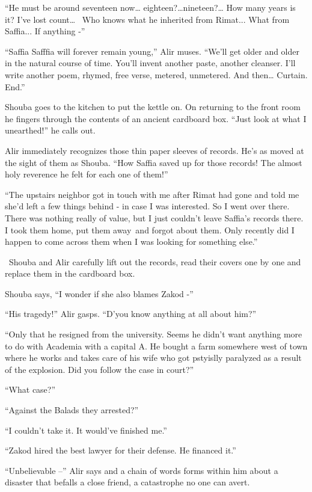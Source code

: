 \documentclass[twoside,11pt]{book}
\begin{document}
``He must be around seventeen now{\dots} eighteen?{\dots}nineteen?{\dots} How many years is it? I've lost
count{\dots} ~Who knows what he inherited from Rimat... What from Saffia... If anything -''

``Saffia Safffia will forever remain young,'' Alir muses. ``We'll get older and
older in the natural course of time. You'll invent another paste, another cleanser. I'll write another poem, rhymed,
free verse, metered, unmetered. And then{\dots} Curtain. End.''

Shouba goes to the kitchen to put the kettle on. On returning to the front room he fingers through the contents of an
ancient cardboard box. ``Just look at what I unearthed!'' he calls out.

Alir immediately recognizes those thin paper sleeves of records. He's as moved at the sight of them as Shouba.
``How Saffia saved up for those records! The almost holy reverence he felt for each one of
them!''

``The upstairs neighbor got in touch with me after Rimat had gone and told me she'd left a few things
behind - in case I was interested. So I went over there. There was nothing really of value, but I just couldn't leave
Saffia's records there. I took them home, put them away~and forgot about them. Only recently did I happen to come
across them when I was looking for something else.''

~Shouba and Alir carefully lift out the records, read their covers one by one and replace them in the cardboard box.

Shouba says, ``I wonder if she also blames Zakod -''

``His tragedy!'' Alir gasps. ``D'you know anything at all about
him?''

``Only that he resigned from the university. Seems he didn't want anything more to do with Academia with a
capital A. He bought a farm somewhere west of town where he works and takes care of his wife who got pstyislly
paralyzed as a result of the explosion. Did you follow the case in court?''

``What case?''

``Against the Balads they arrested?''

``I couldn't take it. It would've finished me.''

``Zakod hired the best lawyer for their defense. He financed it.''

``Unbelievable --'' Alir says and a chain of words forms within him about a disaster that
befalls a close friend, a catastrophe no one can avert.
\end{document}
